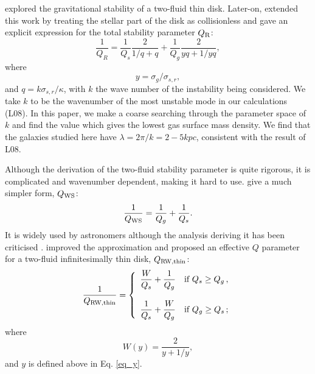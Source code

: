 \documentclass[12pt,preprint]{aastex}
\begin{document}
\citet{jog84} explored the gravitational stability of a two-fluid thin disk. Later-on, \citet{raf01} extended this work by treating the stellar part of the disk as collisionless and gave an explicit expression for the total stability parameter $Q_{\rm R}$:
 \begin{equation}
\frac{1}{Q_{R}}=\frac{1}{Q_s}\frac{2}{1/q+q}+\frac{1}{Q_g}\frac{2}{yq+1/yq},
\label{Qr}
\end{equation}
where 
\begin{equation}
y=\sigma_g/\sigma_{s,r},
\label{eq_y}
\end{equation}
 and $q=k\sigma_{s,r}/\kappa$, with $k$ the wave number of the instability being considered. We take $k$ to be the wavenumber of the most unstable mode in our calculations (L08).  In this paper, we make a coarse searching through the parameter space of $k$ and find  the value which gives the lowest gas surface mass density. We find that the galaxies studied here have $\lambda=2\pi/k = 2-5 kpc$, consistent with the result of L08. 

Although the \citet{raf01} derivation of the two-fluid stability parameter is quite rigorous, it is  complicated and  wavenumber dependent, making it hard to use.   \citet{wan94} give a much simpler form, 
$Q_{\rm WS}$:
\begin{equation}
\frac{1}{Q_{\rm WS}}=\frac{1}{Q_g}+\frac{1}{Q_s}.
\label{Qws}
\end{equation}
It is widely used by astronomers \citep[e.g.][]{mar01} although the analysis deriving it has been criticised \citep{jog96}. \citet{rom11}  improved the \citet{wan94} approximation and proposed an effective $Q$ parameter for a two-fluid infinitesimally thin disk, 
$Q_{\rm RW,thin}$:
\begin{equation}
\label{rwthin}
\frac{1}{Q_{\rm RW,thin}}=
\left\{\begin{array}{ll}
       {\displaystyle\frac{W}{Q_{s}}+\frac{1}{Q_{g}}}
                       & \mbox{if\ }Q_{s}\geq Q_{g}\,, \\
                       &                                            \\
       {\displaystyle\frac{1}{Q_{s}}+\frac{W}{Q_{g}}}
                       & \mbox{if\ }Q_{g}\geq Q_{s}\,;
       \end{array}
\right.
\end{equation}
where 
\begin{equation}
W(y)=\frac{2}{y+1/y},
\end{equation}
and $y$ is defined above in Eq. \ref{eq_y}.
\end{document}

